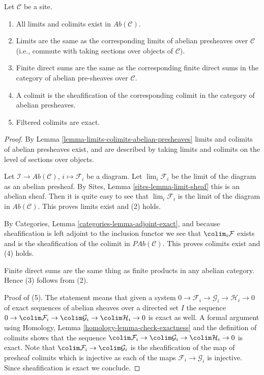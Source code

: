 \begin{lemma}
\label{lemma-limits-colimits-abelian-sheaves}
Let $\mathcal{C}$ be a site.
\begin{enumerate}
\item All limits and colimits exist in $\textit{Ab}(\mathcal{C})$.
\item Limits are the same as the corresponding limits of abelian presheaves
over $\mathcal{C}$ (i.e., commute with taking sections over objects of
$\mathcal{C}$).
\item Finite direct sums are the same as the corresponding finite direct sums
in the category of abelian pre-sheaves over $\mathcal{C}$.
\item A colimit is the sheafification of the corresponding colimit in
the category of abelian presheaves.
\item Filtered colimits are exact.
\end{enumerate}
\end{lemma}

\begin{proof}
By Lemma \ref{lemma-limits-colimits-abelian-presheaves} limits and colimits
of abelian presheaves exist, and are described by taking limits and colimits
on the level of sections over objects.

\medskip\noindent
Let $\mathcal{I} \to \textit{Ab}(\mathcal{C})$, $i \mapsto \mathcal{F}_i$
be a diagram. Let $\lim_i \mathcal{F}_i$ be the limit of the diagram
as an abelian presheaf. By Sites, Lemma \ref{sites-lemma-limit-sheaf}
this is an abelian sheaf. Then it is quite easy to see that
$\lim_i \mathcal{F}_i$ is the limit of the diagram in
$\textit{Ab}(\mathcal{C})$. This proves limits exist and (2) holds.

\medskip\noindent
By Categories, Lemma \ref{categories-lemma-adjoint-exact}, and because
sheafification is left adjoint to the inclusion functor we see that
$\colim_i \mathcal{F}$ exists and is the sheafification of the colimit
in $\textit{PAb}(\mathcal{C})$. This proves colimits exist and (4) holds.

\medskip\noindent
Finite direct sums are the same thing as finite products in any abelian
category. Hence (3) follows from (2).

\medskip\noindent
Proof of (5). The statement means that given a system
$0 \to \mathcal{F}_i \to \mathcal{G}_i \to \mathcal{H}_i \to 0$
of exact sequences of abelian sheaves over a directed set $I$ the sequence
$0 \to \colim \mathcal{F}_i \to \colim \mathcal{G}_i \to
\colim \mathcal{H}_i \to 0$ is exact as well. A formal argument using
Homology, Lemma \ref{homology-lemma-check-exactness} and the
definition of colimits shows that the sequence
$\colim \mathcal{F}_i \to \colim \mathcal{G}_i \to \colim \mathcal{H}_i \to 0$
is exact. Note that $\colim \mathcal{F}_i \to \colim \mathcal{G}_i$
is the sheafification of the map of presheaf colimits which is
injective as each of the maps $\mathcal{F}_i \to \mathcal{G}_i$ is
injective. Since sheafification is exact we conclude.
\end{proof}







